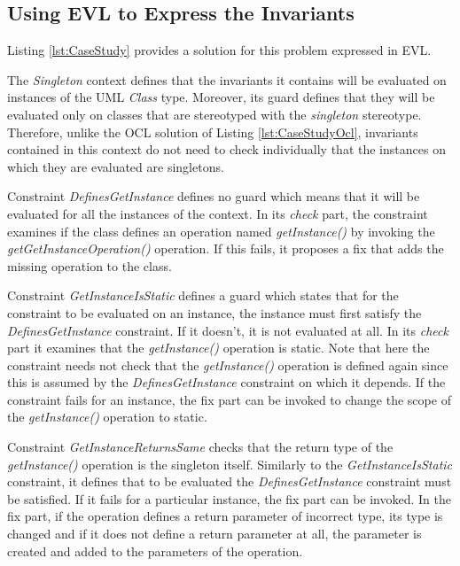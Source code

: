 \subsection{Using EVL to Express the Invariants}

Listing \ref{lst:CaseStudy} provides a solution for this problem expressed in EVL.



The \emph{Singleton} context defines that the invariants it contains will be evaluated on instances of the UML \emph{Class} type. Moreover, its guard defines that they will be evaluated only on classes that are stereotyped with the \emph{singleton} stereotype. Therefore, unlike the OCL solution of Listing \ref{lst:CaseStudyOcl}, invariants contained in this context do not need to check individually that the instances on which they are evaluated are singletons.

Constraint \emph{DefinesGetInstance} defines no guard which means that it will be evaluated for all the instances of the context. In its \emph{check} part, the constraint examines if the class defines an operation named \emph{getInstance()} by invoking the \emph{getGetInstanceOperation()} operation. If this fails, it proposes a fix that adds the missing operation to the class.

Constraint \emph{GetInstanceIsStatic} defines a guard which states that for the constraint to be evaluated on an instance, the instance must first satisfy the \emph{DefinesGetInstance} constraint. If it doesn't, it is not evaluated at all. In its \emph{check} part it examines that the \emph{getInstance()} operation is static. Note that here the constraint needs not check that the \emph{getInstance()} operation is defined again since this is assumed by the \emph{DefinesGetInstance} constraint on which it depends. If the constraint fails for an instance, the fix part can be invoked to change the scope of the \emph{getInstance()} operation to static.

Constraint \emph{GetInstanceReturnsSame} checks that the return type of the \emph{getInstance()} operation is the singleton itself. Similarly to the \emph{GetInstanceIsStatic} constraint, it defines that to be evaluated the \emph{DefinesGetInstance} constraint must be satisfied. If it fails for a particular instance, the fix part can be invoked. In the fix part, if the operation defines a return parameter of incorrect type, its type is changed and if it does not define a return parameter at all, the parameter is created and added to the parameters of the operation.


